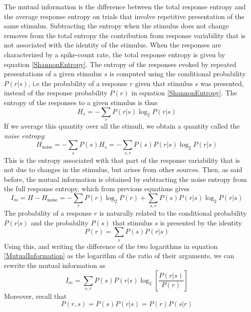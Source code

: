 The mutual information is the difference between the total response entropy and the average response entropy on trials that involve repetitive presentation of the same stimulus. Subtracting the entropy when the stimulus does not change removes from the total entropy the contribution from response variability that is not associated with the identity of the stimulus. When the responses are characterized by a spike-count rate, the total response entropy is given by equation \eqref{ShannonEntropy}. The entropy of the responses evoked by repeated presentations of a given stimulus $s$ is computed using the conditional probability $P(r|s)$, i.e the probability of a response $r$ given that stimulus $s$ was presented, instead of the response probability $P(r)$ in equation \eqref{ShannonEntropy}. The entropy of the responses to a given stimulus is thus
\begin{equation}\label{StimulusEntropy}
H_s=-\sum_rP(r|s)\log_{2}P(r|s)
\end{equation}
If we average this quantity over all the stimuli, we obtain a quantity called the \emph{noise entropy}:
\begin{equation}\label{NoiseEntropy}
H_{\text{noise}}=-\sum_sP(s)H_s=-\sum_{s,r}P(s)P(r|s)\log_{2}P(r|s)
\end{equation}
This is the entropy associated with that part of the response variability that is not due to changes in the stimulus, but arises from other sources. Then, as said before, the mutual information is obtained by subtracting the noise entropy from the full response entropy, which from previous equations gives
\begin{equation}\label{MutualInformation}
I_m=H-H_{\text{noise}}=-\sum_rP(r)\log_{2}P(r)+\sum_{s,r}P(s)P(r|s)\log_{2}P(r|s)
\end{equation}
The probability of a response $r$ is naturally related to the conditional probability $P(r|s)$ and the probability $P(s)$ that stimulus $s$ is presented by the identity
\begin{equation}\label{SumProb}
P(r)=\sum_sP(s)P(r|s)
\end{equation}
Using this, and writing the difference of the two logarithms in equation \eqref{MutualInformation} as the logarithm of the ratio of their arguments, we can rewrite the mutual information as
\begin{equation}\label{MutualInformation1}
I_m=\sum_{s,r}P(s)P(r|s)\log_{2}{\left[\frac{P(r|s)}{P(r)}\right]}
\end{equation}
Moreover, recall that
\begin{equation}
P(r,s)=P(s)P(r|s)=P(r)P(s|r)
\end{equation}
